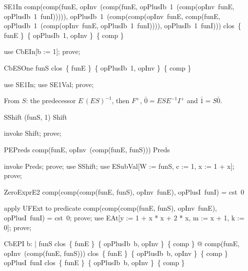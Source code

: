 \documentclass{article}
\begin{document}
\begin{theorem}{SE1In}
  comp(comp(funE, opInv~(comp(funE, opPlusIb~1~(comp(opInv~funE, opPlusIb~1~funI))))), opPlusIb~1~(comp(comp(opInv~funE, comp(funE, opPlusIb~1~(comp(opInv~funE, opPlusIb~1~funI)))), opPlusIb~1~funI))) \in clos~\{ funE \}~\{ opPlusIb~1, opInv \}~\{ comp \}
\end{theorem}

\begin{zproof}
use CbEIn[b := 1];
prove;
\end{zproof}

\begin{theorem}{CbESOne}
  funS \in clos~\{ funE \}~\{ opPlusIb~1, opInv \}~\{ comp \}
\end{theorem}

\begin{zproof}
use SE1In;
use SE1Val;
prove;
\end{zproof}

From $S$: the predecessor $E\,(E S)^{-1}$, then $F^+$, $\bar 0 = E S E^{-1} I^+$ and
$\bar 1 = S \bar 0$.

\begin{theorem}{SShift}
  (funS, 1) \in Shift
\end{theorem}

\begin{zproof}
invoke Shift;
prove;
\end{zproof}

\begin{theorem}{PEPreds}
  comp(funE, opInv~(comp(funE, funS))) \in Preds
\end{theorem}

\begin{zproof}
invoke Preds;
prove;
use SShift;
use ESubVal[W := funS, c := 1, x := 1 + x];
prove;
\end{zproof}

\begin{theorem}{ZeroExprE2}
  comp(comp(comp(funE, funS), opInv~funE), opPlusI~funI) = cst~0
\end{theorem}

\begin{zproof}
apply UFExt to predicate comp(comp(comp(funE, funS), opInv~funE), opPlusI~funI) = cst~0;
prove;
use EAt[y := 1 + x * x + 2 * x, m := x + 1, k := 0];
prove;
\end{zproof}

\begin{theorem}{CbEPI}
  \forall b: \nat | funS \in clos~\{ funE \}~\{ opPlusIb~b, opInv \}~\{ comp \} @ comp(funE, opInv~(comp(funE, funS))) \in clos~\{ funE \}~\{ opPlusIb~b, opInv \}~\{ comp \} \land opPlusI~funI \in clos~\{ funE \}~\{ opPlusIb~b, opInv \}~\{ comp \}
\end{theorem}
\end{document}
